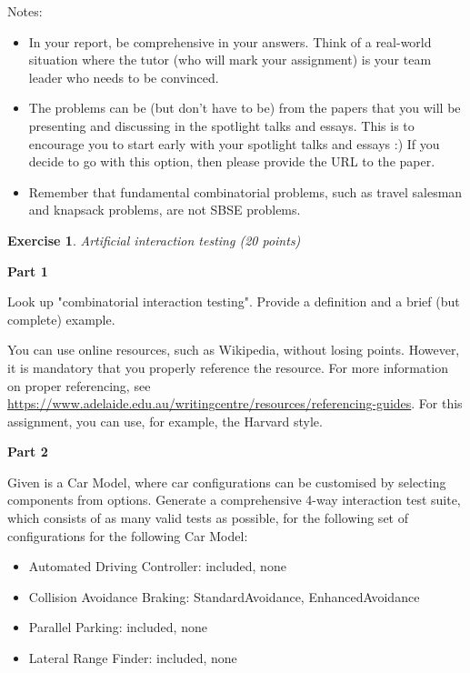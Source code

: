 \documentclass{pracs}
\newtheorem{exercise}{Exercise}
\begin{document}
Notes:
\begin{itemize}
\item In your report, be comprehensive in your answers. Think of a real-world situation where the tutor (who will mark your assignment) is your team leader who needs to be convinced.
\item The problems can be (but don't have to be) from the papers that you will be presenting and discussing in the spotlight talks and essays. This is to encourage you to start early with your spotlight talks and essays :) If you decide to go with this option, then please provide the URL to the paper.
\item Remember that fundamental combinatorial problems, such as travel salesman and knapsack problems, are not SBSE problems.  
\end{itemize}


\begin{exercise}
Artificial interaction testing  (20 points)
\end{exercise}

\textbf{Part 1}

Look up "combinatorial interaction testing". Provide a definition and a brief (but complete) example.

You can use online resources, such as Wikipedia, without losing points. However, it is mandatory that you properly reference the resource. For more information on proper referencing, see \url{https://www.adelaide.edu.au/writingcentre/resources/referencing-guides}. For this assignment, you can use, for example, the Harvard style. %

\textbf{Part 2}

Given is a Car Model, where car configurations can be customised by selecting components from options. Generate a comprehensive 4-way interaction test suite, which consists of as many valid tests as possible, for the following set of configurations for the following Car Model:

\begin{itemize}
\item Automated Driving Controller: included, none
\item Collision Avoidance Braking: StandardAvoidance, EnhancedAvoidance
\item Parallel Parking: included, none
\item Lateral Range Finder: included, none
\end{itemize}
\end{document}
